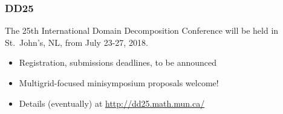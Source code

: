 \documentclass[12pt,t,xcolor=dvipsnames]{beamer}
\begin{document}
\begin{frame}
  \frametitle{DD25}


  The 25th International Domain Decomposition Conference will be held
  in St.\ John's, NL, from July 23-27, 2018.
  \begin{itemize}
  \item Registration, submissions deadlines, to be announced
  \item Multigrid-focused minisymposium proposals welcome!
  \item Details (eventually) at \url{http://dd25.math.mun.ca/}
  \end{itemize}

\begin{center}
%
%
%
\end{center}
  

\end{frame}
\end{document}
